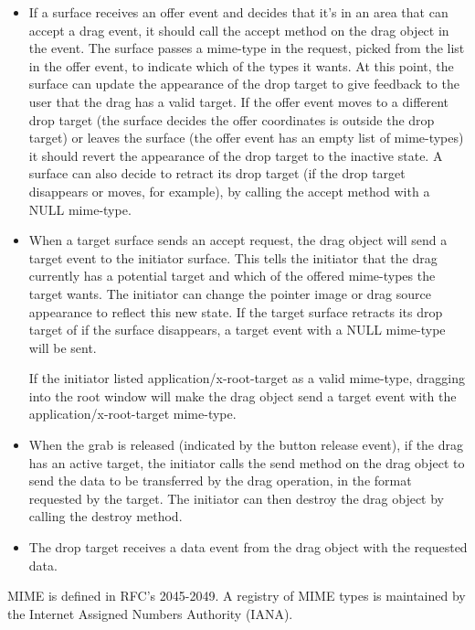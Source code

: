 \documentclass{article}
\begin{document}
\begin{itemize}
\item If a surface receives an offer event and decides that it's in an
  area that can accept a drag event, it should call the accept method
  on the drag object in the event.  The surface passes a mime-type in
  the request, picked from the list in the offer event, to indicate
  which of the types it wants.  At this point, the surface can update
  the appearance of the drop target to give feedback to the user that
  the drag has a valid target.  If the offer event moves to a
  different drop target (the surface decides the offer coordinates is
  outside the drop target) or leaves the surface (the offer event has
  an empty list of mime-types) it should revert the appearance of the
  drop target to the inactive state.  A surface can also decide to
  retract its drop target (if the drop target disappears or moves, for
  example), by calling the accept method with a NULL mime-type.

\item When a target surface sends an accept request, the drag object
  will send a target event to the initiator surface.  This tells the
  initiator that the drag currently has a potential target and which
  of the offered mime-types the target wants.  The initiator can
  change the pointer image or drag source appearance to reflect this
  new state.  If the target surface retracts its drop target of if the
  surface disappears, a target event with a NULL mime-type will be
  sent.

  If the initiator listed application/x-root-target as a valid
  mime-type, dragging into the root window will make the drag object
  send a target event with the application/x-root-target mime-type.

\item When the grab is released (indicated by the button release
  event), if the drag has an active target, the initiator calls the
  send method on the drag object to send the data to be transferred by
  the drag operation, in the format requested by the target.  The
  initiator can then destroy the drag object by calling the destroy
  method.

\item The drop target receives a data event from the drag object with
  the requested data.
\end{itemize}

MIME is defined in RFC's 2045-2049. A registry of MIME types is
maintained by the Internet Assigned Numbers Authority (IANA).
\end{document}
